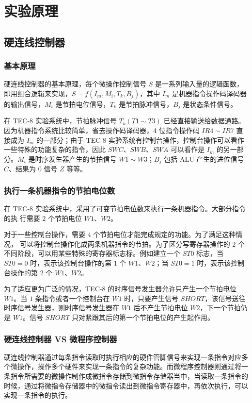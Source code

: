 \documentclass[12pt]{article}
\begin{document}
{\section{实验原理}
    \subsection{硬连线控制器}
        \subsubsection{基本原理}
            硬连线控制器的基本原理，每个微操作控制信号 $S$ 是一系列输入量的逻辑函数，即用组合逻辑来实现，$S=f(I_m,M_i,T_k,B_j)$，其中 $I_m$ 是机器指令操作码译码器的输出信号，$M_i$ 是节拍电位信号，$T_k$ 是节拍脉冲信号，$B_j$ 是状态条件信号。
            
            在 TEC-8 实验系统中，节拍脉冲信号 $T_k(T1\sim T3)$ 已经直接输送给数据通路。因为机器指令系统比较简单，省去操作码译码器，4 位指令操作码 $IR4\sim IR7$ 直接成为 $I_m$ 的一部分；由于 TEC-8 实验系统有控制台操作，控制台操作可以看作一些特殊的功能复杂的指令，因此 $SWC$、$SWB$、$SWA$ 可以看作是 $I_m$ 的另一部分。$M_i$ 是时序发生器产生的节拍信号 $W1\sim W3$；$B_j$ 包括 ALU 产生的进位信号 $C$、结果为 $0$ 信号 $Z$ 等等。
            
        \subsubsection{执行一条机器指令的节拍电位数}
            在 TEC-8 实验系统中，采用了可变节拍电位数来执行一条机器指令。大部分指令的执 行需要 $2$ 个节拍电位 $W1$、$W2$。
        
            对于一些控制台操作，需要 $4$ 个节拍电位才能完成规定的功能。为了满足这种情况， 可以将控制台操作化成两条机器指令的节拍。为了区分写寄存器操作的 $2$ 个不同阶段，可以用某些特殊的寄存器标志标。例如建立一个 $ST0$ 标志，当 $ST0=0$ 时，表示该控制台操作的第 $1$ 个 $W1$、$W2$；当 $ST0=1$ 时，表示该控制台操作的第 $2$ 个 $W1$、$W2$。
    
            为了适应更为广泛的情况，TEC-8 的时序信号发生器允许只产生一个节拍电位 $W1$。当 $1$ 条指令或者一个控制台在 $W1$ 时，只要产生信号 $SHORT$，该信号送往时序信号发生器，则时序信号发生器在 $W1$ 后不产生节拍电位 $W2$，下一个节拍仍是 $W1$。信号 $SHORT$ 只对紧跟其后的第一个节拍电位的产生起作用。
            
        \subsubsection{硬连线控制器 VS 微程序控制器}
            硬连线控制器通过每条指令读取时执行相应的硬件管脚信号来实现一条指令对应多个微操作，操作多个硬件来实现一条指令的复杂功能。而微程序控制器则通过将一条指令所需要的微操作制作成微指令存储到微指令存储器当中，当读取一条指令的时候，通过将微指令存储器中的微指令读出到微指令寄存器中，再依次执行，可以实现一条指令的执行。
            
}
\end{document}
